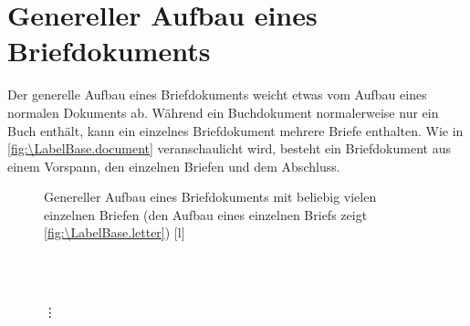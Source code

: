 \section{Genereller Aufbau eines Briefdokuments}
\BeginIndexGroup
{}

Der generelle Aufbau eines Briefdokuments weicht etwas vom Aufbau eines
normalen Dokuments ab. Während ein Buchdokument normalerweise nur ein Buch
enthält, kann ein einzelnes Briefdokument mehrere Briefe enthalten.  Wie in
\autoref{fig:\LabelBase.document} veranschaulicht wird, besteht ein
Briefdokument aus einem Vorspann, den einzelnen Briefen und dem Abschluss.

\begin{figure}
  \setcapindent{0pt}%
  \begin{captionbeside}{%
      Genereller Aufbau eines Briefdokuments mit
      beliebig vielen einzelnen Briefen (den Aufbau eines einzelnen
      Briefs zeigt \autoref{fig:\LabelBase.letter})%
      \label{fig:\LabelBase.document}}[l]
    \begin{minipage}[b]{.667\linewidth}
      \centering\small\setlength{\fboxsep}{1.5ex}%
      \addtolength{\linewidth}{-\dimexpr2\fboxrule+2\fboxsep\relax}%
      \\
      \\[2pt]
      \parbox{\linewidth}{\raggedright\vspace{-.5ex}\vdots\vspace{1ex}}\\
      \\[\dimexpr\fboxsep+\fboxrule\relax]
    \end{minipage}
  \end{captionbeside}
\end{figure}

